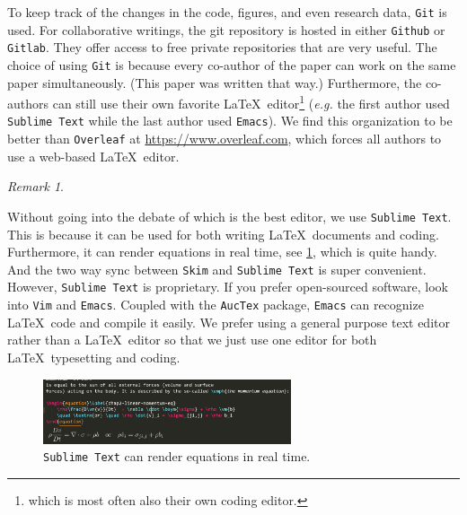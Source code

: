 \documentclass[authoryear,12pta4paper,fleqn]{article}
\newcommand{\eg}{\textit{e.g.}\xspace}
\numberwithin{equation}{section}
\theoremstyle{remark}
\newtheorem{rmk}{Remark}
\begin{document}
To keep track of the changes in the code, figures, and even research data, \texttt{Git} is used. For collaborative writings, the git repository is hosted in either \texttt{Github} or \texttt{Gitlab}. They offer access to free private repositories that are very useful. The choice of using \texttt{Git} is because every co-author of the paper can work on the same paper simultaneously. (This paper was written that way.) Furthermore,
the co-authors can still use their own favorite \LaTeX\ editor\footnote{which is most often also their own coding editor.} (\eg the first author used \texttt{Sublime Text} while the last author used \texttt{Emacs}). We find this organization to be better than \texttt{Overleaf} at \url{https://www.overleaf.com}, which forces all authors to use a web-based \LaTeX\ editor.





\begin{rmk}\label{rm:a}

Without going into the debate of which is the best editor, we use \texttt{Sublime Text}. This is
because it can be used for both writing \LaTeX\ documents and coding. Furthermore, it can render equations in real time, see  \cref{fig:sublime-text}, which is quite handy. And the two way sync between \texttt{Skim} and \texttt{Sublime Text} is super convenient. However, \texttt{Sublime Text} is proprietary. If you prefer open-sourced software, look into \texttt{Vim} and \texttt{Emacs}. Coupled with the \texttt{AucTex} package, \texttt{Emacs} can recognize \LaTeX\ code and compile it easily. We prefer using a general purpose text editor rather than a \LaTeX\ editor so that we just use one editor  for both \LaTeX\ typesetting and coding. 


\begin{figure}[h!]
  \centering 
   \includegraphics[width=0.65\textwidth]{sublime-text}
   \caption{\texttt{Sublime Text} can render equations in real time.}
\label{fig:sublime-text}
\end{figure}
\end{rmk}
\end{document}
